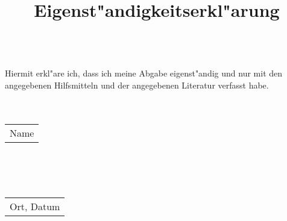 \documentclass{article}
\title{Eigenst"andigkeitserkl"arung}
\date{}
\begin{document}
\maketitle
\ \\
Hiermit erkl"are ich, dass ich meine Abgabe eigenst"andig und nur mit den 
angegebenen Hilfsmitteln und der angegebenen Literatur verfasst habe.\\
\\
\\
\begin{tabular}{L{10cm}}
    \\
    \hline
    Name\\
\end{tabular}\\
\\
\\
\begin{tabular}{L{6cm}}
    \\
    \hline
    Ort, Datum\\
\end{tabular}
\end{document}
